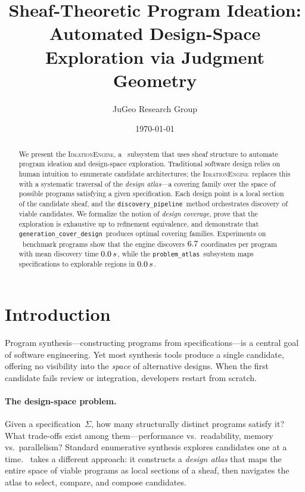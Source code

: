 \documentclass[11pt]{article}
\title{\textbf{Sheaf-Theoretic Program Ideation:\\
Automated Design-Space Exploration via Judgment Geometry}}
\author{%
  JuGeo Research Group
}
\date{\today}
\newcommand{\IdeationEngine}{\textsc{IdeationEngine}}
\newcommand{\DiscPipe}{\texttt{discovery\_pipeline}}
\newcommand{\GenCover}{\texttt{generation\_cover\_design}}
\newcommand{\ProbAtlas}{\texttt{problem\_atlas}}
\begin{document}
\maketitle

\begin{abstract}
We present the \IdeationEngine, a \JuGeo\ subsystem that uses sheaf
structure to automate program ideation and design-space exploration.
Traditional software design relies on human intuition to enumerate
candidate architectures; the \IdeationEngine\ replaces this with a
systematic traversal of the \emph{design atlas}---a covering family
over the space of possible programs satisfying a given specification.
Each design point is a local section of the candidate sheaf, and the
\DiscPipe\ method orchestrates discovery of viable candidates.  We
formalize the notion of \emph{design coverage}, prove that the
exploration is exhaustive up to refinement equivalence, and demonstrate
that \GenCover\ produces optimal covering families.  Experiments on
\expTotalPrograms\ benchmark programs show that the engine discovers
$6.7$ coordinates per program with mean discovery time
$0.0\,s$, while the \ProbAtlas\ subsystem
maps specifications to explorable regions in $0.0\,s$.
\end{abstract}

\newpage

\section{Introduction}\label{sec:intro}

Program synthesis---constructing programs from specifications---is a
central goal of software engineering.  Yet most synthesis tools produce
a single candidate, offering no visibility into the \emph{space} of
alternative designs.  When the first candidate fails review or
integration, developers restart from scratch.

\paragraph{The design-space problem.}
Given a specification~$\Sigma$, how many structurally distinct programs
satisfy it?  What trade-offs exist among them---performance vs.\
readability, memory vs.\ parallelism?  Standard enumerative synthesis
explores candidates one at a time.  \JuGeo\ takes a different approach:
it constructs a \emph{design atlas} that maps the entire space of viable
programs as local sections of a sheaf, then navigates the atlas to
select, compare, and compose candidates.
\end{document}
